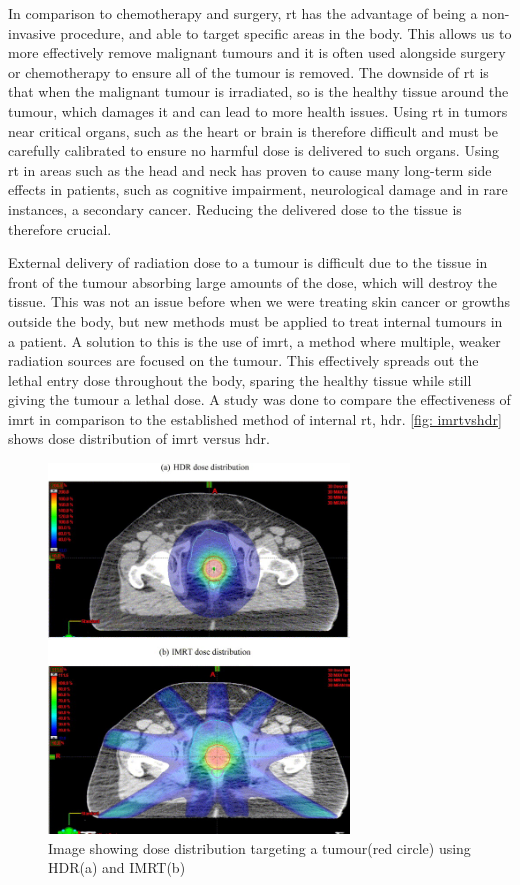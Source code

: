 \documentclass[main.tex]{subfiles}
\begin{document}
 In comparison to chemotherapy and surgery, \gls{rt} has the advantage of being a non-invasive procedure, and able to target specific areas in the body. This allows us to more effectively remove malignant tumours and it is often used alongside surgery or chemotherapy to ensure all of the tumour is removed. The downside of \gls{rt} is that when the malignant tumour is irradiated, so is the healthy tissue around the tumour, which damages it and can lead to more health issues. Using \gls{rt} in tumors near critical organs, such as the heart or brain is therefore difficult and must be carefully calibrated to ensure no harmful dose is delivered to such organs. Using \gls{rt} in areas such as the head and neck has proven to cause many long-term side effects in patients, such as cognitive impairment, neurological damage and in rare instances, a secondary cancer\cite{headRTData}. Reducing the delivered dose to the tissue is therefore crucial.
 
 External delivery of radiation dose to a tumour is difficult due to the tissue in front of the tumour absorbing large amounts of the dose, which will destroy the tissue. This was not an issue before when we were treating skin cancer or growths outside the body, but new methods must be applied to treat internal tumours in a patient. A solution to this is the use of \gls{imrt}, a method where multiple, weaker radiation sources are focused on the tumour. This effectively spreads out the lethal entry dose throughout the body, sparing the healthy tissue while still giving the tumour a lethal dose. A study was done to compare the effectiveness of \gls{imrt} in comparison to the established method of internal \gls{rt}, \gls{hdr}\cite{imrtVShdr}. \autoref{fig: imrtvshdr} shows dose distribution of \gls{imrt} versus \gls{hdr}.

 \begin{figure}[!htpb]
    \centering
    \includegraphics[width=8cm ]{images/imrt vs hdr.jpg}
    \caption{Image showing dose distribution targeting a tumour(red circle) using HDR(a) and IMRT(b)\cite{imrtVShdr}}
    \label{fig: imrtvshdr}
\end{figure}
\FloatBarrier 
\end{document}

